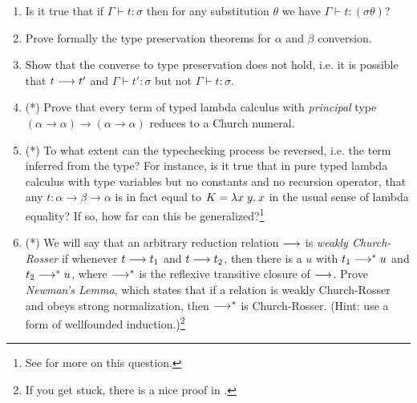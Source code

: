 \begin{enumerate}

\item Is it true that if $\Gamma \vdash t:\sigma$ then for any substitution
$\theta$ we have $\Gamma \vdash t:(\sigma \theta)$?

\item Prove formally the type preservation theorems for $\alpha$ and $\beta$
conversion.

\item Show that the converse to type preservation does not hold, i.e. it is
possible that $t \longrightarrow t'$ and $\Gamma \vdash t':\sigma$ but not $\Gamma
\vdash t:\sigma$.

\item (*) Prove that every term of typed lambda calculus with {\em principal}
type $(\alpha \to \alpha) \to (\alpha \to \alpha)$ reduces to a Church numeral.

\item (*) To what extent can the typechecking process be reversed, i.e. the
term inferred from the type? For instance, is it true that in pure typed lambda
calculus with type variables but no constants and no recursion operator, that
any $t:\alpha \to \beta \to \alpha$ is in fact equal to $K = \lambda x\; y.\: x$ in
the usual sense of lambda equality? If so, how far can this be
generalized?\footnote{See  for more on this question.}

\item (*) We will say that an arbitrary reduction relation $\longrightarrow$ is {\em
weakly Church-Rosser} if whenever $t \longrightarrow t_1$ and $t \longrightarrow t_2$, then
there is a $u$ with $t_1 \longrightarrow^* u$ and $t_2 \longrightarrow^* u$, where $\longrightarrow^*$
is the reflexive transitive closure of $\longrightarrow$. Prove {\em Newman's Lemma},
which states that if a relation is weakly Church-Rosser and obeys strong
normalization, then $\longrightarrow^*$ is Church-Rosser. (Hint: use a form of
wellfounded induction.)\footnote{If you get stuck, there is a nice proof in
.}

\end{enumerate}

